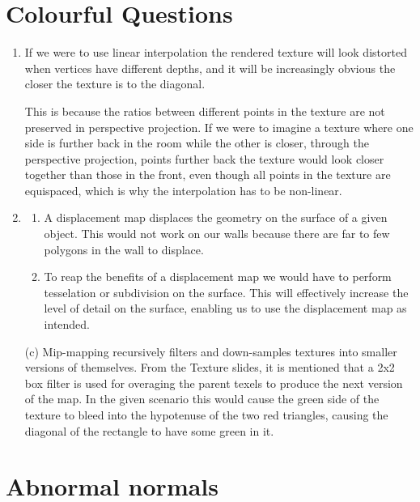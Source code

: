 \documentclass[11pt,a4paper]{report}
\begin{document}
\section{Colourful Questions}
\begin{enumerate}[label=(\alph*)]\setcounter{enumi}{0}
	\item If we were to use linear interpolation the rendered texture will look distorted when vertices have different depths, and it will be increasingly obvious the closer the texture is to the diagonal.
	
	This is because the ratios between different points in the texture are not preserved in perspective projection.
	If we were to imagine a texture where one side is further back in the room while the other is closer, through the perspective projection, points further back the texture would look closer together than those in the front, even though all points in the texture are equispaced, which is why the interpolation has to be non-linear.
	
	\item \begin{enumerate}[label=(\alph*)]\setcounter{enumi}{0}
		\item A displacement map displaces the geometry on the surface of a given object. This would not work on our walls because there are far to few polygons in the wall to displace.
		\item To reap the benefits of a displacement map we would have to perform tesselation or subdivision on the surface. This will effectively increase the level of detail on the surface, enabling us to use the displacement map as intended. \end{enumerate}

	\item[(c)] Mip-mapping recursively filters and down-samples textures into smaller versions of themselves. From the Texture slides, it is mentioned that a 2x2 box filter is used for overaging the parent texels to produce the next version of the map.
	In the given scenario this would cause the green side of the texture to bleed into the hypotenuse of the two red triangles, causing the diagonal of the rectangle to have some green in it.
	
	
	
\end{enumerate}

\clearpage


\section{Abnormal normals}
\end{document}
